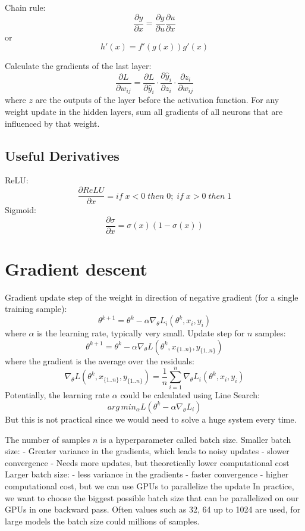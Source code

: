 \documentclass{scrartcl}
\begin{document}
Chain rule:
$$\frac{\partial y}{\partial x}=\frac{\partial y}{\partial u} \frac{\partial u}{\partial x}$$
or
$$h'(x) = f'(g(x))g'(x)$$

Calculate the gradients of the last layer:
$$\frac{\partial L}{\partial w_{ij}} = \frac{\partial L}{\partial \hat{y}_i} \cdot \frac{\partial \hat{y}_i}{\partial z_i} \cdot \frac{\partial z_i}{\partial w_{ij}}$$
where $z$ are the outputs of the layer before the activation function.
For any weight update in the hidden layers, sum all gradients of all neurons that are influenced by that weight.

\subsection*{Useful Derivatives}
ReLU:
$$\frac{\partial ReLU}{\partial x} = if \; x < 0 \; then \; 0; \; if \; x > 0 \; then \; 1$$
Sigmoid:
$$\frac{\partial \sigma}{\partial x} = \sigma (x) (1 - \sigma (x))$$


\section*{Gradient descent}
Gradient update step of the weight in direction of negative gradient (for a single training sample):
$$\theta^{k+1} = \theta^k - \alpha \nabla_\theta L_i(\theta^k, x_i,y_i)$$
where $\alpha$ is the learning rate, typically very small.
Update step for $n$ samples:
$$\theta^{k+1} = \theta^k - \alpha \nabla_\theta L(\theta^k, x_{\{1..n\}}, y_{\{1..n\}})$$
where the gradient is the average over the residuals:
$$\nabla_\theta L(\theta^k, x_{\{1..n\}}, y_{\{1..n\}}) = \frac{1}{n} \sum_{i=1}^{n} \nabla_\theta L_i(\theta^k, x_i, y_i)$$
Potentially, the learning rate $\alpha$ could be calculated using Line Search:
$$arg \, min_\alpha L(\theta^k - \alpha \nabla_\theta L_i)$$
But this is not practical since we would need to solve a huge system every time.

The number of samples $n$ is a hyperparameter called batch size.
Smaller batch size:
- Greater variance in the gradients, which leads to noisy updates
- slower convergence
- Needs more updates, but theoretically lower computational cost
Larger batch size:
- less variance in the gradients
- faster convergence
- higher computational cost, but we can use GPUs to parallelize the update
In practice, we want to choose the biggest possible batch size that can be parallelized on our GPUs in one backward pass. Often values such as 32, 64 up to 1024 are used, for large models the batch size could millions of samples.
\end{document}
